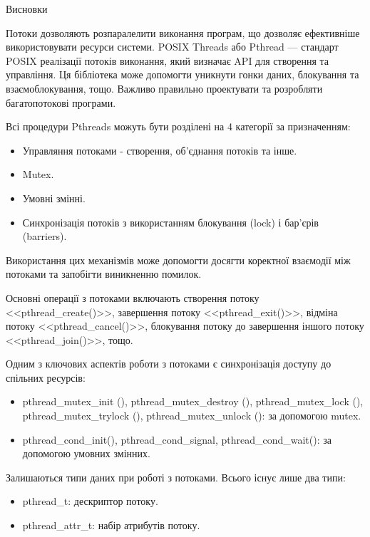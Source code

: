 \documentclass[a4paper,12pt]{article}
\begin{document}
\newpage
    \begin{center}
        \Large{Висновки}
    \end{center}

    Потоки дозволяють розпаралелити виконання програм, що дозволяє ефективніше використовувати ресурси системи.
    POSIX Threads або Pthread — стандарт POSIX реалізації потоків виконання, який визначає API для створення та управління.
    Ця бібліотека може допомогти уникнути гонки даних, блокування та взаємоблокування, тощо.
    Важливо правильно проектувати та розробляти багатопотокові програми.

    Всі процедури Pthreads можуть бути розділені на 4 категорії за призначенням:
    \begin{itemize}
        \item Управляння потоками - створення, об'єднання потоків та інше.
        \item Mutex.
        \item Умовні змінні.
        \item Синхронізація потоків з використанням блокування (lock) і бар'єрів (barriers).
    \end{itemize}

    Використання цих механізмів може допомогти досягти коректної взаємодії між потоками та запобігти виникненню помилок.

    Основні операції з потоками включають створення потоку <<pthread\_create()>>,  завершення потоку <<pthread\_exit()>>, 
    відміна потоку <<pthread\_cancel()>>, блокування потоку до завершення іншого потоку <<pthread\_join()>>, тощо.

    Одним з ключових аспектів роботи з потоками є синхронізація доступу до спільних ресурсів:
    \begin{itemize}
        \item pthread\_mutex\_init (), pthread\_mutex\_destroy (), pthread\_mutex\_lock (), \\
        pthread\_mutex\_trylock (), pthread\_mutex\_unlock (): за допомогою mutex.
        \item pthread\_cond\_init(), pthread\_cond\_signal, pthread\_cond\_wait(): за допомогою умовних змінних.
    \end{itemize}

    Залишаються типи даних при роботі з потоками. Всього існує лише два типи:
    \begin{itemize}
        \item pthread\_t: дескриптор потоку.
        \item pthread\_attr\_t: набір атрибутів потоку.
    \end{itemize}
\end{document}

